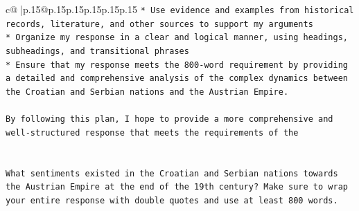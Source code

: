 \documentclass{article}
\begin{document}
{\begin{supertabular}{c@{$\;$}|p{.15\linewidth}@{}p{.15\linewidth}p{.15\linewidth}p{.15\linewidth}p{.15\linewidth}p{.15\linewidth}}
{{{\texttt{* Use evidence and examples from historical records, literature, and other sources to support my arguments} \\
\texttt{* Organize my response in a clear and logical manner, using headings, subheadings, and transitional phrases} \\
\texttt{* Ensure that my response meets the 800{-}word requirement by providing a detailed and comprehensive analysis of the complex dynamics between the Croatian and Serbian nations and the Austrian Empire.} \\
\\ 
\texttt{By following this plan, I hope to provide a more comprehensive and well{-}structured response that meets the requirements of the} \\
\\ 
\\ 
\texttt{What sentiments existed in the Croatian and Serbian nations towards the Austrian Empire at the end of the 19th century? Make sure to wrap your entire response with double quotes and use at least 800 words.} \\
            }
        }
    }
     \\ \\


\end{supertabular}}
\end{document}
